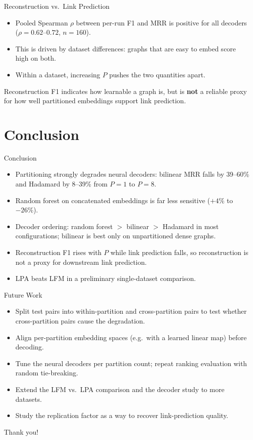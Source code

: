 \documentclass[aspectratio=169]{beamer}
\begin{document}
\begin{frame}{Reconstruction vs.\ Link Prediction}
  \begin{itemize}
    \item Pooled Spearman $\rho$ between per-run F1 and MRR is positive for all decoders ($\rho = 0.62$--$0.72$, $n=160$).
    \item This is driven by dataset differences: graphs that are easy to embed score high on both.
    \item Within a dataset, increasing $P$ pushes the two quantities apart.
  \end{itemize}
  \vspace{0.5em}
  Reconstruction F1 indicates how learnable a graph is, but is \textbf{not} a reliable proxy for how well partitioned embeddings support link prediction.
\end{frame}

\section{Conclusion}

\begin{frame}{Conclusion}
  \begin{itemize}
    \item Partitioning strongly degrades neural decoders: bilinear MRR falls by 39--60\% and Hadamard by 8--39\% from $P=1$ to $P=8$.
    \item Random forest on concatenated embeddings is far less sensitive ($+4\%$ to $-26\%$).
    \item Decoder ordering: random forest $>$ bilinear $>$ Hadamard in most configurations; bilinear is best only on unpartitioned dense graphs.
    \item Reconstruction F1 rises with $P$ while link prediction falls, so reconstruction is not a proxy for downstream link prediction.
    \item LPA beats LFM in a preliminary single-dataset comparison.
  \end{itemize}
\end{frame}

\begin{frame}{Future Work}
  \begin{itemize}
    \item Split test pairs into within-partition and cross-partition pairs to test whether cross-partition pairs cause the degradation.
    \item Align per-partition embedding spaces (e.g.\ with a learned linear map) before decoding.
    \item Tune the neural decoders per partition count; repeat ranking evaluation with random tie-breaking.
    \item Extend the LFM vs.\ LPA comparison and the decoder study to more datasets.
    \item Study the replication factor as a way to recover link-prediction quality.
  \end{itemize}
\end{frame}

\begin{frame}
  \centering
  \Large Thank you!
\end{frame}
\end{document}
